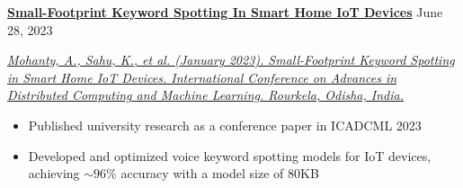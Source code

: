 \textbf{\href{https://link.springer.com/chapter/10.1007/978-981-99-1203-2_6}{Small-Footprint Keyword Spotting In Smart Home IoT Devices}} \hfill June 28, 2023 \par
\textit{\href{https://link.springer.com/chapter/10.1007/978-981-99-1203-2_6}{Mohanty, A., Sahu, K., et al. (January 2023). Small-Footprint Keyword Spotting in Smart Home IoT Devices. International Conference on Advances in Distributed Computing and Machine Learning. Rourkela, Odisha, India. \faExternalLink}}
\begin{itemize}
	\item Published university research as a conference paper in ICADCML 2023
	\item Developed and optimized voice keyword spotting models for IoT devices, achieving $\sim96\%$ accuracy with a model size of 80KB
\end{itemize}\vspace{0.1cm} \par